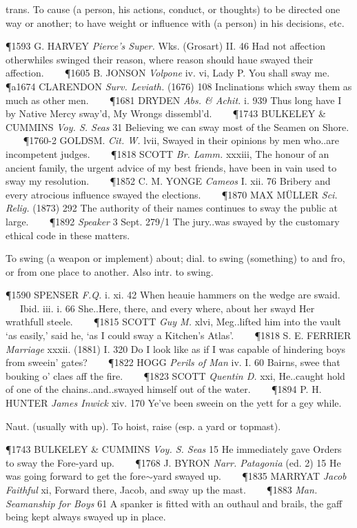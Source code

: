 \begin{description}[wide, labelwidth=!, labelindent=0pt]
\begin{myenumerate}
 trans. To cause (a person, his actions, conduct, or thoughts) to be directed one way or another; to have weight or influence with (a person) in his decisions, etc.

\P 1593 G. HARVEY  \textit{Pierce's Super.} Wks. (Grosart) II. 46 Had not affection otherwhiles swinged their reason, where reason should haue swayed their affection.    
\P 1605 B. JONSON  \textit{Volpone} iv. vi, Lady P. You shall sway me.    
\P a1674 CLARENDON  \textit{Surv. Leviath.} (1676) 108 Inclinations which sway them as much as other men.    
\P 1681 DRYDEN  \textit{Abs. \& Achit.} i. 939 Thus long have I by Native Mercy sway'd, My Wrongs dissembl'd.    
\P 1743 BULKELEY \& CUMMINS  \textit{Voy. S. Seas} 31 Believing we can sway most of the Seamen on Shore.    
\P 1760-2 GOLDSM.  \textit{Cit. W.} lvii, Swayed in their opinions by men who..are incompetent judges.    
\P 1818 SCOTT  \textit{Br. Lamm.} xxxiii, The honour of an ancient family, the urgent advice of my best friends, have been in vain used to sway my resolution.    
\P 1852 C. M. YONGE  \textit{Cameos} I. xii. 76 Bribery and every atrocious influence swayed the elections.    
\P 1870 MAX MÜLLER  \textit{Sci. Relig.} (1873) 292 The authority of their names continues to sway the public at large.    
\P 1892 \textit{Speaker}  3 Sept. 279/1 The jury..was swayed by the customary ethical code in these matters.

 To swing (a weapon or implement) about; dial. to swing (something) to and fro, or from one place to another. Also intr. to swing.

\P 1590 SPENSER  \textit{F.Q.} i. xi. 42 When heauie hammers on the wedge are swaid.    Ibid. iii. i. 66 She..Here, there, and every where, about her swayd Her wrathfull steele.    
\P 1815 SCOTT  \textit{Guy M.} xlvi, Meg..lifted him into the vault ‘as easily,’ said he, ‘as I could sway a Kitchen's Atlas’.    
\P 1818 S. E. FERRIER  \textit{Marriage} xxxii. (1881) I. 320 Do I look like as if I was capable of hindering boys from sweein' gates?    
\P 1822 HOGG  \textit{Perils of Man} iv. I. 60 Bairns, swee that bouking o' claes aff the fire.    
\P 1823 SCOTT  \textit{Quentin D.} xxi, He..caught hold of one of the chains..and..swayed himself out of the water.    
\P 1894 P. H. HUNTER  \textit{James Inwick} xiv. 170 Ye've been sweein on the yett for a gey while.

 Naut. (usually with up). To hoist, raise (esp. a yard or topmast).

\P 1743 BULKELEY \& CUMMINS  \textit{Voy. S. Seas} 15 He immediately gave Orders to sway the Fore-yard up.    
\P 1768 J. BYRON  \textit{Narr. Patagonia} (ed. 2) 15 He was going forward to get the fore$\sim$yard swayed up.    
\P 1835 MARRYAT  \textit{Jacob Faithful} xi, Forward there, Jacob, and sway up the mast.    
\P 1883 \textit{Man.  Seamanship for Boys} 61 A spanker is fitted with an outhaul and brails, the gaff being kept always swayed up in place.


\end{myenumerate}
\end{description}
